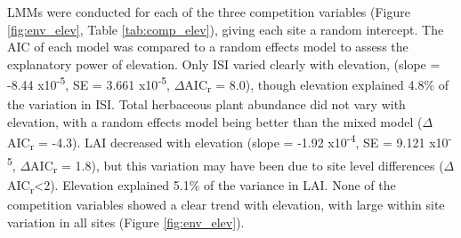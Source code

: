 \documentclass[a4paper,10pt,]{report}
\begin{document}
LMMs were conducted for each of the three competition variables (Figure \ref{fig:env_elev}, Table \ref{tab:comp_elev}), giving each site a random intercept. The AIC of each model was compared to a random effects model to assess the explanatory power of elevation. Only ISI varied clearly with elevation, (slope = -8.44 x10\textsuperscript{-5}, SE = 3.661 x10\textsuperscript{-5}, $\Delta$AIC\textsubscript{r} = 8.0), though elevation explained 4.8\% of the variation in ISI. Total herbaceous plant abundance did not vary with elevation, with a random effects model being better than the mixed model ($\Delta$AIC\textsubscript{r} = -4.3). LAI decreased with elevation (slope = -1.92 x10\textsuperscript{-4}, SE = 9.121 x10\textsuperscript{-5}, $\Delta$AIC\textsubscript{r} = 1.8), but this variation may have been due to site level differences ($\Delta$AIC\textsubscript{r}<2). Elevation explained 5.1\% of the variance in LAI. None of the competition variables showed a clear trend with elevation, with large within site variation in all sites (Figure \ref{fig:env_elev}).
\end{document}
